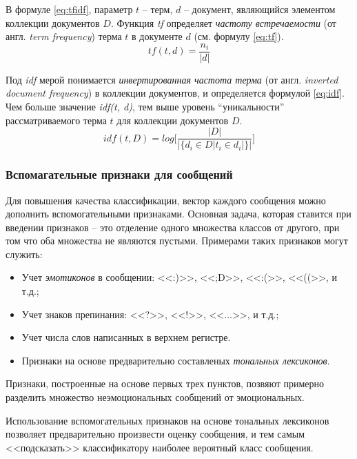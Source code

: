         В формуле \ref{eq:tfidf}, параметр $t$ -- терм, $d$ -- документ, являющийся
        элементом коллекции документов $D$. Функция {\it tf} определяет {\it частоту встречаемости}
        (от англ. {\it term frequency}) терма $t$ в документе $d$ (см. формулу \ref{eq:tf}).
        \begin{equation}
            \label{eq:tf}
            tf(t, d) = \dfrac{n_i}{|d|}
        \end{equation}

        Под {\it idf } мерой понимается {\it инвертированная частота терма} (от англ.
        {\it inverted document frequency}) в коллекции документов, и определяется
        формулой \ref{eq:idf}. Чем больше значение {\it idf(t, d)}, тем выше уровень
        ``уникальности'' рассматриваемого терма $t$ для коллекции документов $D$.
        \begin{equation}
            \label{eq:idf}
            idf(t, D) = log \Bigg[ \dfrac{|D|}{|\{d_i \in D | t_i \in d_i|\}|} \Bigg]
        \end{equation}

        \subsubsection{Вспомагательные признаки для сообщений}
        \label{sec:additionalFeatures}

        Для повышения качества классификации, вектор каждого сообщения можно дополнить
        вспомогательными признаками. Основная задача, которая ставится при введении
        признаков -- это отделение одного множества классов от другого, при том что
        оба множества не являются пустыми. Примерами таких признаков могут служить:
        \begin{itemize}
            \item Учет {\it эмотиконов} в сообщении: <<:)>>, <<;D>>, <<:(>>, <<((>>, и т.д.;
            \item Учет знаков препинания: <<?>>, <<!>>, <<...>>, и т.д.;
            \item Учет числа слов написанных в верхнем регистре.
            \item Признаки на основе предварительно составленых {\it тональных лексиконов}.
        \end{itemize}

        Признаки, построенные на основе первых трех пунктов, позвяют примерно разделить
        множество неэмоциональных сообщений от эмоциональных.

        Использование вспомогательных признаков на основе тональных лексиконов
        позволяет предварительно произвести оценку сообщения, и тем самым
        <<подсказать>> классификатору наиболее вероятный класс сообщения.
